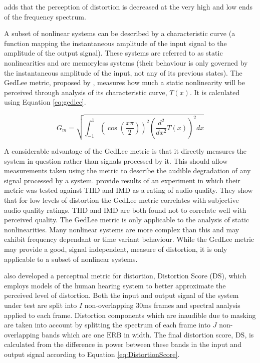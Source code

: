 			\citet{voishvillo2006assessment} adds that the perception of distortion is decreased at the very
			high and low ends of the frequency spectrum.

			A subset of nonlinear systems can be described by a characteristic curve (a function mapping the
			instantaneous amplitude of the input signal to the amplitude of the output signal). These systems
			are referred to as static nonlinearities and are memoryless systems (their behaviour is only
			governed by the instantaneous amplitude of the input, not any of its previous states). The GedLee
			metric, proposed by \citet{geddes2003auditory}, measures how much a static nonlinearity will be
			perceived through analysis of its characteristic curve, $T(x)$. It is calculated using Equation
			\ref{eq:gedlee}.

			\begin{equation}
				G_{m} = \sqrt{\int_{-1}^{1} \left( \cos \left( \frac{x\pi}{2} \right) \right)^{2}
					      \left( \frac{d^{2}}{dx^{2}} T(x) \right)^{2} dx}
				\label{eq:gedlee}
			\end{equation}

			A considerable advantage of the GedLee metric is that it directly measures the system in question
			rather than signals processed by it. This should allow measurements taken using the metric to
			describe the audible degradation of any signal processed by a system. \citet{lee2003auditory}
			provide results of an experiment in which their metric was tested against THD and IMD as a rating of
			audio quality. They show that for low levels of distortion the GedLee metric correlates with
			subjective audio quality ratings. THD and IMD are both found not to correlate well with perceived
			quality. The GedLee metric is only applicable to the analysis of static nonlinearities. Many
			nonlinear systems are more complex than this and may exhibit frequency dependant or time variant
			behaviour. While the GedLee metric may provide a good, signal independent, measure of distortion, it
			is only applicable to a subset of nonlinear systems.

			\citet{tan2003the} also developed a perceptual metric for distortion, Distortion Score
			($\mathrm{DS}$), which employs models of the human hearing system to better approximate the
			perceived level of distortion.  Both the input and output signal of the system under test are split
			into $I$ non-overlapping 30ms frames and spectral analysis applied to each frame. Distortion
			components which are inaudible due to masking are taken into account by splitting the spectrum of
			each frame into $J$ non-overlapping bands which are one $\mathrm{ERB}$ in width. The final
			distortion score, $\mathrm{DS}$, is calculated from the difference in power between these bands in
			the input and output signal according to Equation \ref{eq:DistortionScore}.

